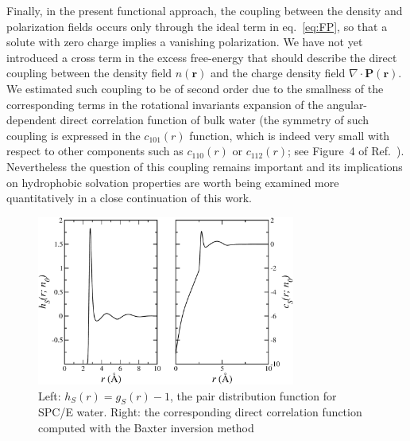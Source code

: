 \documentclass[aip,jcp,showpacs,amsmath,amssymb,superscriptaddress]{revtex4-1}
\newcommand{\rr}{\mathbf{r}}
\newcommand{\PP}{\mathbf{P}}
\begin{document}
Finally, in the present functional approach, the coupling between the density and polarization fields occurs only through the ideal term in eq.~\ref{eq:FP}, so that a solute with zero charge implies a vanishing polarization. We have not yet introduced  a  cross term in the excess free-energy that should describe the direct coupling between the density field $n(\rr)$ and the  charge density field $\nabla \cdot \PP(\rr)$. We estimated such coupling to be of second order due to the smallness of the corresponding terms in the rotational invariants expansion of the angular-dependent direct correlation function of bulk water (the symmetry of such coupling is expressed in the $c_{101}(r)$ function, which is indeed very small with respect to other components such as $c_{110}(r)$ or $c_{112}(r)$; see Figure~4 of Ref.~).  Nevertheless the question of this coupling remains important and its implications on hydrophobic solvation properties are worth being examined more  quantitatively in a close continuation of this work.




\newpage




\newpage

\begin{figure}
    \includegraphics[width=8.5cm]{h+c_spce.pdf}
    \caption{Left: $h_S(r) = g_S(r) - 1$, the pair distribution function for SPC/E water. Right: the corresponding direct correlation function 
        computed with the Baxter inversion method\cite{ramirez02,ramirez05-CP}        \label{fig:cS_spce}
        }
\end{figure}
\end{document}
